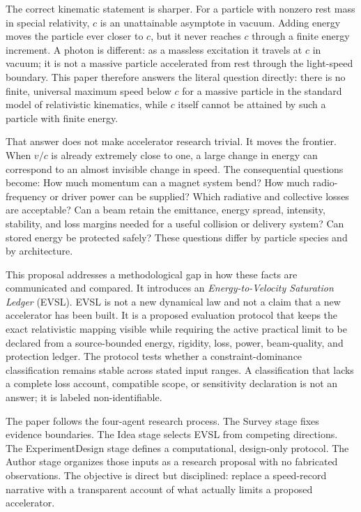 \documentclass[conference]{../../../../Conference-LaTeX-template_10-17-19/IEEEtran}
\begin{document}
The correct kinematic statement is sharper. For a particle with nonzero rest mass in special relativity, $c$ is an unattainable asymptote in vacuum. Adding energy moves the particle ever closer to $c$, but it never reaches $c$ through a finite energy increment. A photon is different: as a massless excitation it travels at $c$ in vacuum; it is not a massive particle accelerated from rest through the light-speed boundary. This paper therefore answers the literal question directly: there is no finite, universal maximum speed below $c$ for a massive particle in the standard model of relativistic kinematics, while $c$ itself cannot be attained by such a particle with finite energy.

That answer does not make accelerator research trivial. It moves the frontier. When $v/c$ is already extremely close to one, a large change in energy can correspond to an almost invisible change in speed. The consequential questions become: How much momentum can a magnet system bend? How much radio-frequency or driver power can be supplied? Which radiative and collective losses are acceptable? Can a beam retain the emittance, energy spread, intensity, stability, and loss margins needed for a useful collision or delivery system? Can stored energy be protected safely? These questions differ by particle species and by architecture.

This proposal addresses a methodological gap in how these facts are communicated and compared. It introduces an \emph{Energy-to-Velocity Saturation Ledger} (EVSL). EVSL is not a new dynamical law and not a claim that a new accelerator has been built. It is a proposed evaluation protocol that keeps the exact relativistic mapping visible while requiring the active practical limit to be declared from a source-bounded energy, rigidity, loss, power, beam-quality, and protection ledger. The protocol tests whether a constraint-dominance classification remains stable across stated input ranges. A classification that lacks a complete loss account, compatible scope, or sensitivity declaration is not an answer; it is labeled non-identifiable.

The paper follows the four-agent research process. The Survey stage fixes evidence boundaries. The Idea stage selects EVSL from competing directions. The ExperimentDesign stage defines a computational, design-only protocol. The Author stage organizes those inputs as a research proposal with no fabricated observations. The objective is direct but disciplined: replace a speed-record narrative with a transparent account of what actually limits a proposed accelerator.
\end{document}
